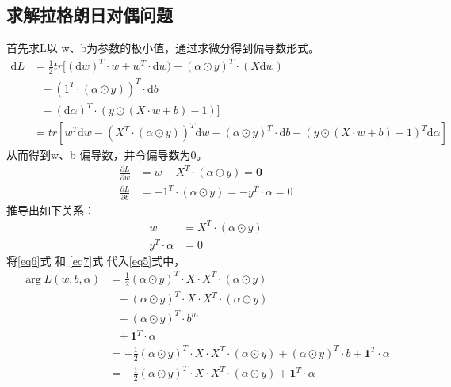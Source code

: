 \documentclass[12pt, a4paper, oneside]{ctexart}
\begin{document}
\subsection{求解拉格朗日对偶问题}
首先求L以 w、b为参数的极小值，通过求微分得到偏导数形式。
\begin{align}
    \mathrm{d}L &= \frac{1}{2}tr[(\mathrm{d}w)^T \cdot w + w^T \cdot \mathrm{d}w) - (\alpha \odot y) ^T \cdot(X\mathrm{d}w) \nonumber \\
                & \ \ \  - (1^T\cdot(\alpha \odot y)) ^T \cdot \mathrm{d}b \nonumber\\
                & \ \ \  - (\mathrm{d}\alpha)^T \cdot (y \odot (X \cdot w + b) - 1)] \nonumber \\
                &= tr[w^T\mathrm{d}w - (X^T\cdot(\alpha \odot y))^T\mathrm{d}w - (\alpha \odot y) ^T \cdot \mathrm{d}b - (y \odot (X \cdot w + b) - 1)^T\mathrm{d}\alpha] \nonumber
\end{align}
从而得到w、b 偏导数，并令偏导数为0。
\begin{align}
    \frac{\partial L}{\partial w} &= w - X^T\cdot(\alpha \odot y) = \boldsymbol{0} \nonumber \\
    \frac{\partial L}{\partial b} &= - 1^T\cdot(\alpha \odot y) = - y^T \cdot \alpha = 0  \nonumber
\end{align}
推导出如下关系：
\begin{align}
    w &= X^T\cdot(\alpha \odot y) \label{eq6} \\
    y^T \cdot \alpha &= 0 \label{eq7}
\end{align}
将\eqref{eq6}式 和 \eqref{eq7}式 代入\eqref{eq5}式中，
\begin{align}
    \mathop{\arg\max_{\alpha}} L(w, b, {\alpha}) &= \frac{1}{2}(\alpha \odot y)^T \cdot X \cdot X^T \cdot (\alpha \odot y) \nonumber \\
                      & \ \ \  - (\alpha \odot y)^T \cdot X \cdot X^T \cdot (\alpha \odot y) \nonumber \\
                      & \ \ \  - (\alpha \odot y)^T \cdot b^m  \nonumber \\
                      & \ \ \  + \boldsymbol{1}^T\cdot\alpha  \nonumber \\
                      &= -\frac{1}{2}(\alpha \odot y)^T \cdot X \cdot X^T \cdot (\alpha \odot y) + (\alpha \odot y)^T \cdot b + \boldsymbol{1}^T\cdot\alpha \nonumber \\
                      &= -\frac{1}{2}(\alpha \odot y)^T \cdot X \cdot X^T \cdot (\alpha \odot y) + \boldsymbol{1}^T\cdot\alpha \nonumber 
\end{align}
\end{document}
